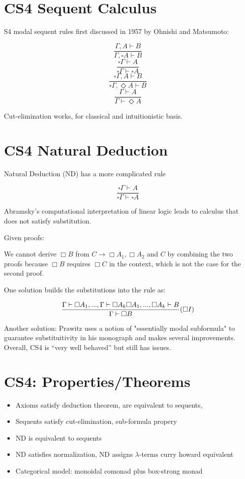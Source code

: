 \documentclass[11pt]{article}
\begin{document}
\section{CS4 Sequent Calculus}
S4 modal sequent rules first discussed in 1957 by Ohnishi and Matsumoto:

$$\frac{\Gamma, A \vdash B}{\Gamma, \square A \vdash B}$$
$$\frac{\square\Gamma \vdash A}{\square\Gamma\vdash\square A}$$
$$\frac{\square\Gamma, A \vdash B}{\square\Gamma,\Diamond A \vdash B}$$
$$\frac{\Gamma\vdash A}{\Gamma \vdash \Diamond A}$$

Cut-elimination works, for classical and intuitionistic basis.

\section{CS4 Natural Deduction}
Natural Deduction (ND) has a more complicated rule

$$\frac{\square\Gamma\vdash A}{\square\Gamma\vdash\square A}$$

Abramsky's computational interpretation of linear logic leads to calculus that does not satisfy substitution\cite{abramsky1993_linear_logic}.

Given proofs:

We cannot derive $\Box B$ from $C \to \Box A_1, \Box A_2$ and $C$ by combining the two proofs because $\Box B$ requires $\Box C$ in the context, which is not the case for the second proof.

One solution builds the substitutions into the rule as:

$$\frac{\Gamma \vdash \square A_1,...,\Gamma\vdash\square A_k\space \square A_1,...,\square A_k \vdash B}{\Gamma\vdash\square B}(\square I)$$

Another solution: Prawitz uses a notion of "essentially modal subformula" to guarantee substituitivity in his monograph and makes several improvements. Overall, CS4 is ``very well behaved'' but still has issues.


\section{CS4: Properties/Theorems}
\begin{itemize}
    \item Axioms satisfy deduction theorem, are equivalent to sequents,
    \item Sequents satisfy cut-elimination, sub-formula propery
    \item ND is equivalent to sequents
    \item ND satisfies normalization, ND assigns $\lambda$-terms curry howard equivalent
    \item Categorical model: monoidal comonad plus box-strong monad
\end{itemize}
\end{document}
